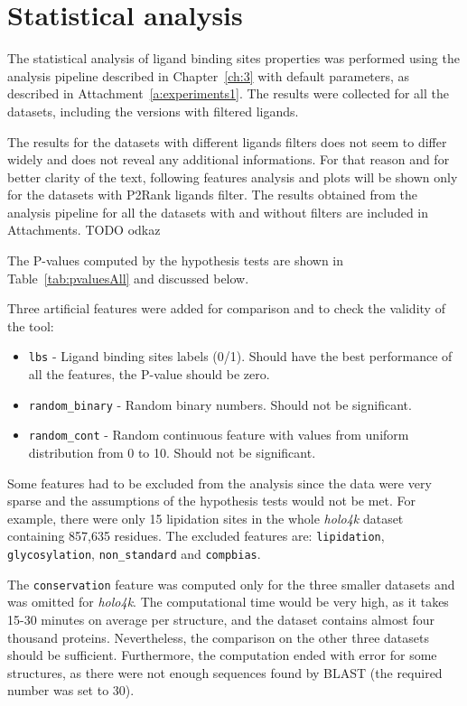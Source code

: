 \newpage
\section{Statistical analysis}

The statistical analysis of ligand binding sites properties was performed using the analysis pipeline described in Chapter~\ref{ch:3} with default parameters, as described in Attachment~\ref{a:experiments1}. The results were collected for all the datasets, including the versions with filtered ligands.

The results for the datasets with different ligands filters does not seem to differ widely and does not reveal any additional informations. For that reason and for better clarity of the text, following features analysis and plots will be shown only for the datasets with P2Rank ligands filter. The results obtained from the analysis pipeline for all the datasets with and without filters are included in Attachments. TODO odkaz

The P-values computed by the hypothesis tests are shown in Table~\ref{tab:pvaluesAll} and discussed below.

Three artificial features were added for comparison and to check the validity of the tool:
\begin{itemize}
  \item \texttt{lbs} - Ligand binding sites labels (0/1). Should have the best performance of all the features, the P-value should be zero.
  \item \texttt{random\_binary} - Random binary numbers. Should not be significant.
  \item \texttt{random\_cont} - Random continuous feature with values from uniform distribution from 0 to 10. Should not be significant.
\end{itemize}

Some features had to be excluded from the analysis since the data were very sparse and the assumptions of the hypothesis tests would not be met. For example, there were only 15 lipidation sites in the whole \textit{holo4k} dataset containing  857,635 residues. The excluded features are: \texttt{lipidation}, \texttt{glycosylation}, \texttt{non\_standard} and \texttt{compbias}.

The \texttt{conservation} feature was computed only for the three smaller datasets and was omitted for \textit{holo4k}. The computational time would be very high, as it takes 15-30 minutes on average per structure, and the dataset contains almost four thousand proteins. Nevertheless, the comparison on the other three datasets should be sufficient. Furthermore, the computation ended with error for some structures, as there were not enough sequences found by BLAST \cite{blast} (the required number was set to 30).

